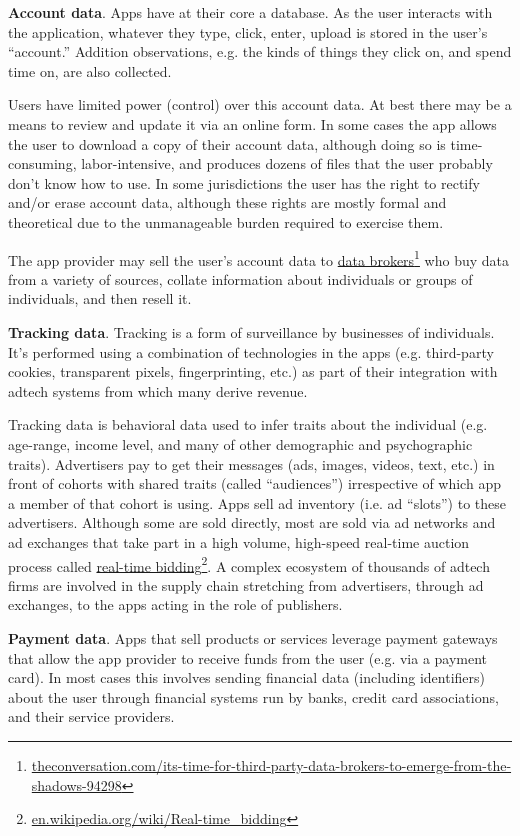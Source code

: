 \documentclass[11pt, oneside]{article}   	%
\newcommand{\hyperfootnote}[1][]{\def\ArgI{{#1}}\hyperfootnoteRelay}
\newcommand\hyperfootnoteRelay[2][]{\href{#1#2}{\ArgI}\footnote{\href{#1#2}{#2}}}
\begin{document}
\textbf{Account data}. Apps have at their core a database. As the user interacts with the application, whatever they type, click, enter, upload is stored in the user's ``account.'' Addition observations, e.g. the kinds of things they click on, and spend time on, are also collected. 

Users have limited power (control) over this account data. At best there may be a means to review and update it via an online form. In some cases the app allows the user to download a copy of their account data, although doing so is time-consuming, labor-intensive, and produces dozens of files that the user probably don't know how to use. In some jurisdictions the user has the right to rectify and/or erase account data, although these rights are mostly formal and theoretical due to the unmanageable burden required to exercise them.

The app provider may sell the user's account data to \hyperfootnote[data brokers][https://]{theconversation.com/its-time-for-third-party-data-brokers-to-emerge-from-the-shadows-94298} who buy data from a variety of sources, collate information about individuals or groups of individuals, and then resell it.

\textbf{Tracking data}. Tracking is a form of surveillance by businesses of individuals. It's performed using a combination of technologies in the apps (e.g. third-party cookies, transparent pixels, fingerprinting, etc.) as part of their integration with adtech systems from which many derive revenue. 

Tracking data is behavioral data used to infer traits about the individual (e.g. age-range, income level, and many of other demographic and psychographic traits). Advertisers pay to get their messages (ads, images, videos, text, etc.) in front of cohorts with shared traits (called ``audiences'') irrespective of which app a member of that cohort is using. Apps sell ad inventory (i.e. ad ``slots'') to these advertisers. Although some are sold directly, most are sold via ad networks and ad exchanges that take part in a high volume, high-speed real-time auction process called \hyperfootnote[real-time bidding][https://]{en.wikipedia.org/wiki/Real-time\_bidding}. A complex ecosystem of thousands of adtech firms are involved in the supply chain stretching from advertisers, through ad exchanges, to the apps acting in the role of publishers. 

\textbf{Payment data}. Apps that sell products or services leverage payment gateways that allow the app provider to receive funds from the user (e.g. via a payment card). In most cases this involves sending financial data (including identifiers) about the user through financial systems run by banks, credit card associations, and their service providers.
\end{document}
